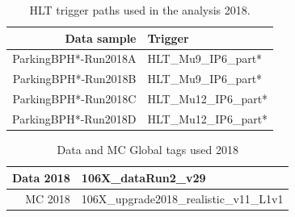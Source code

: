 \begin{table}[htb]
\caption{HLT trigger paths used in the analysis 2018.}
\begin{center}
\begin{tabular}{r|l}\hline
\hline
 Data sample & Trigger \\
\hline
 ParkingBPH*-Run2018A & HLT\_Mu9\_IP6\_part* \\
 \hline
 ParkingBPH*-Run2018B & HLT\_Mu9\_IP6\_part* \\
 ParkingBPH*-Run2018C & HLT\_Mu12\_IP6\_part* \\
 ParkingBPH*-Run2018D & HLT\_Mu12\_IP6\_part* \\
 \hline
 \hline
\end{tabular}
\label{tab:triggers18}
\end{center}
\end{table}

\begin{table}[htb]
\caption{Data and MC Global tags used 2018}
\begin{center}
\begin{tabular}{r|l}\hline
 Data 2018 & 106X\_dataRun2\_v29 \\
 \hline
 MC 2018   & 106X\_upgrade2018\_realistic\_v11\_L1v1 \\
 \hline
\end{tabular}
\label{tab:GT}
\end{center}
\end{table}


